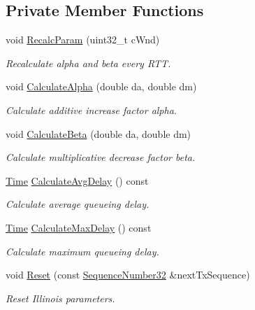 \subsection*{Private Member Functions}
\begin{DoxyCompactItemize}
\item 
void \hyperlink{classns3_1_1TcpIllinois_a15c2ea39f742b9cb8ae4fe4723059837}{Recalc\+Param} (uint32\+\_\+t c\+Wnd)
\begin{DoxyCompactList}\small\item\em Recalculate alpha and beta every R\+TT. \end{DoxyCompactList}\item 
void \hyperlink{classns3_1_1TcpIllinois_a473c7333be614f3183c81048c93049b2}{Calculate\+Alpha} (double da, double dm)
\begin{DoxyCompactList}\small\item\em Calculate additive increase factor alpha. \end{DoxyCompactList}\item 
void \hyperlink{classns3_1_1TcpIllinois_a7306f1cde806901aed1f93d6c43ce9d4}{Calculate\+Beta} (double da, double dm)
\begin{DoxyCompactList}\small\item\em Calculate multiplicative decrease factor beta. \end{DoxyCompactList}\item 
\hyperlink{classns3_1_1Time}{Time} \hyperlink{classns3_1_1TcpIllinois_a1fe8006b836cb497fe79108ab62c1c84}{Calculate\+Avg\+Delay} () const 
\begin{DoxyCompactList}\small\item\em Calculate average queueing delay. \end{DoxyCompactList}\item 
\hyperlink{classns3_1_1Time}{Time} \hyperlink{classns3_1_1TcpIllinois_afd446c963a9d47064bfe3befd1dfa016}{Calculate\+Max\+Delay} () const 
\begin{DoxyCompactList}\small\item\em Calculate maximum queueing delay. \end{DoxyCompactList}\item 
void \hyperlink{classns3_1_1TcpIllinois_adf4b3324f0d026515758691b036483ed}{Reset} (const \hyperlink{group__network_gacb2070e4e98d2d5135c9bede58f07a03}{Sequence\+Number32} \&next\+Tx\+Sequence)
\begin{DoxyCompactList}\small\item\em Reset Illinois parameters. \end{DoxyCompactList}\end{DoxyCompactItemize}
